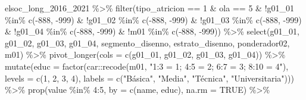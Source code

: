 \documentclass[
  12pt,
]{book}
\newenvironment{Shaded}{\begin{snugshade}}{\end{snugshade}}
\newcommand{\AttributeTok}[1]{\textcolor[rgb]{0.77,0.63,0.00}{#1}}
\newcommand{\ConstantTok}[1]{\textcolor[rgb]{0.00,0.00,0.00}{#1}}
\newcommand{\DecValTok}[1]{\textcolor[rgb]{0.00,0.00,0.81}{#1}}
\newcommand{\FunctionTok}[1]{\textcolor[rgb]{0.00,0.00,0.00}{#1}}
\newcommand{\NormalTok}[1]{#1}
\newcommand{\SpecialCharTok}[1]{\textcolor[rgb]{0.00,0.00,0.00}{#1}}
\newcommand{\StringTok}[1]{\textcolor[rgb]{0.31,0.60,0.02}{#1}}
\begin{document}
\begin{Shaded}
\begin{Highlighting}[]
\NormalTok{elsoc\_long\_2016\_2021 }\SpecialCharTok{\%\textgreater{}\%} 
  \FunctionTok{filter}\NormalTok{(tipo\_atricion }\SpecialCharTok{==} \DecValTok{1} \SpecialCharTok{\&}\NormalTok{ ola }\SpecialCharTok{==} \DecValTok{5} \SpecialCharTok{\&} \SpecialCharTok{!}\NormalTok{g01\_01 }\SpecialCharTok{\%in\%} \FunctionTok{c}\NormalTok{(}\SpecialCharTok{{-}}\DecValTok{888}\NormalTok{, }\SpecialCharTok{{-}}\DecValTok{999}\NormalTok{) }\SpecialCharTok{\&} \SpecialCharTok{!}\NormalTok{g01\_02 }\SpecialCharTok{\%in\%} \FunctionTok{c}\NormalTok{(}\SpecialCharTok{{-}}\DecValTok{888}\NormalTok{, }\SpecialCharTok{{-}}\DecValTok{999}\NormalTok{) }\SpecialCharTok{\&} \SpecialCharTok{!}\NormalTok{g01\_03 }\SpecialCharTok{\%in\%} \FunctionTok{c}\NormalTok{(}\SpecialCharTok{{-}}\DecValTok{888}\NormalTok{, }\SpecialCharTok{{-}}\DecValTok{999}\NormalTok{) }\SpecialCharTok{\&} \SpecialCharTok{!}\NormalTok{g01\_04 }\SpecialCharTok{\%in\%} \FunctionTok{c}\NormalTok{(}\SpecialCharTok{{-}}\DecValTok{888}\NormalTok{, }\SpecialCharTok{{-}}\DecValTok{999}\NormalTok{) }\SpecialCharTok{\&} \SpecialCharTok{!}\NormalTok{m01 }\SpecialCharTok{\%in\%} \FunctionTok{c}\NormalTok{(}\SpecialCharTok{{-}}\DecValTok{888}\NormalTok{, }\SpecialCharTok{{-}}\DecValTok{999}\NormalTok{)) }\SpecialCharTok{\%\textgreater{}\%} 
  \FunctionTok{select}\NormalTok{(g01\_01, g01\_02, g01\_03, g01\_04, segmento\_disenno, estrato\_disenno, ponderador02, m01) }\SpecialCharTok{\%\textgreater{}\%} 
  \FunctionTok{pivot\_longer}\NormalTok{(}\AttributeTok{cols =} \FunctionTok{c}\NormalTok{(g01\_01, g01\_02, g01\_03, g01\_04)) }\SpecialCharTok{\%\textgreater{}\%}
  \FunctionTok{mutate}\NormalTok{(}\AttributeTok{educ =} \FunctionTok{factor}\NormalTok{(car}\SpecialCharTok{::}\FunctionTok{recode}\NormalTok{(m01, }\StringTok{"1:3 = 1; 4:5 = 2; 6:7 = 3; 8:10 = 4"}\NormalTok{),}
                        \AttributeTok{levels =} \FunctionTok{c}\NormalTok{(}\DecValTok{1}\NormalTok{, }\DecValTok{2}\NormalTok{, }\DecValTok{3}\NormalTok{, }\DecValTok{4}\NormalTok{), }
                       \AttributeTok{labels =} \FunctionTok{c}\NormalTok{(}\StringTok{"Básica"}\NormalTok{, }\StringTok{"Media"}\NormalTok{, }\StringTok{"Técnica"}\NormalTok{, }\StringTok{"Universitaria"}\NormalTok{))) }\SpecialCharTok{\%\textgreater{}\%}
  \FunctionTok{prop}\NormalTok{(value }\SpecialCharTok{\%in\%} \DecValTok{4}\SpecialCharTok{:}\DecValTok{5}\NormalTok{, }\AttributeTok{by =} \FunctionTok{c}\NormalTok{(name, educ), }\AttributeTok{na.rm =} \ConstantTok{TRUE}\NormalTok{) }\SpecialCharTok{\%\textgreater{}\%} 

\end{Highlighting}
\end{Shaded}
\end{document}
